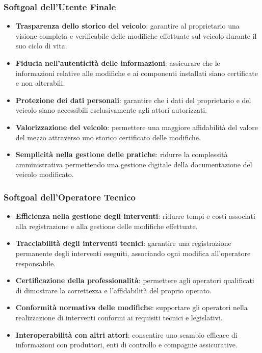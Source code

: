 \subsubsection*{Softgoal dell'Utente Finale}

\begin{itemize}
    \item \textbf{Trasparenza dello storico del veicolo}: garantire al proprietario una visione completa e verificabile delle modifiche effettuate sul veicolo durante il suo ciclo di vita.
    \item \textbf{Fiducia nell'autenticit\`a delle informazioni}: assicurare che le informazioni relative alle modifiche e ai componenti installati siano certificate e non alterabili.
    \item \textbf{Protezione dei dati personali}: garantire che i dati del proprietario e del veicolo siano accessibili esclusivamente agli attori autorizzati.
    \item \textbf{Valorizzazione del veicolo}: permettere una maggiore affidabilit\`a del valore del mezzo attraverso uno storico certificato delle modifiche.
    \item \textbf{Semplicit\`a nella gestione delle pratiche}: ridurre la complessit\`a amministrativa permettendo una gestione digitale della documentazione del veicolo modificato.
\end{itemize}

\subsubsection*{Softgoal dell'Operatore Tecnico}

\begin{itemize}
    \item \textbf{Efficienza nella gestione degli interventi}: ridurre tempi e costi associati alla registrazione e alla gestione delle modifiche effettuate.
    \item \textbf{Tracciabilit\`a degli interventi tecnici}: garantire una registrazione permanente degli interventi eseguiti, associando ogni modifica all'operatore responsabile.
    \item \textbf{Certificazione della professionalit\`a}: permettere agli operatori qualificati di dimostrare la correttezza e l'affidabilit\`a del proprio operato.
    \item \textbf{Conformit\`a normativa delle modifiche}: supportare gli operatori nella realizzazione di interventi conformi ai requisiti tecnici e legislativi.
    \item \textbf{Interoperabilit\`a con altri attori}: consentire uno scambio efficace di informazioni con produttori, enti di controllo e compagnie assicurative.
\end{itemize}

